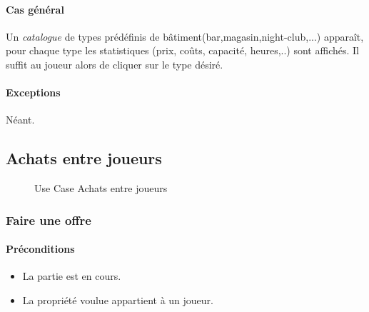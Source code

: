 \documentclass[a4paper,11pt]{report}
\begin{document}
\paragraph{Cas général}
Un \textit{catalogue} de types prédéfinis de bâtiment(bar,magasin,night-club,...) apparaît, pour chaque type les statistiques (prix, coûts, capacité, heures,..) sont affichés. Il suffit au joueur alors de cliquer sur le type désiré.
\paragraph{Exceptions} Néant.



\newpage
\subsection{Achats entre joueurs}
\begin{figure}[ht]
    \caption{Use Case Achats entre joueurs}
\end{figure}
\subsubsection{Faire une offre}
\paragraph{Préconditions}
\begin{itemize}
 \item La partie est en cours.
 \item La propriété voulue appartient à un joueur.
\end{itemize}
\end{document}
